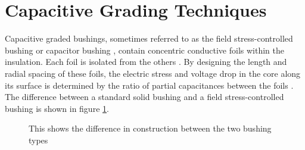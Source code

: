 \section{Capacitive Grading Techniques}
Capacitive graded bushings, sometimes referred to as the field stress-controlled bushing or capacitor bushing \cite{kuffel2000high}, contain concentric conductive foils within the insulation.
Each foil is isolated from the others \cite{Ahmed11}.
By designing the length and radial spacing of these foils, the electric stress and voltage drop in the core along its surface is determined by the ratio of partial capacitances between the foils \cite{Ahmed11}.
The difference between a standard solid bushing and a field stress-controlled bushing is shown in figure \ref{Figure:typesofbushing}.

\begin{figure}[!htb]
  \centering
\caption{This shows the difference in construction between the two bushing types}
  \label{Figure:typesofbushing}
\end{figure}



